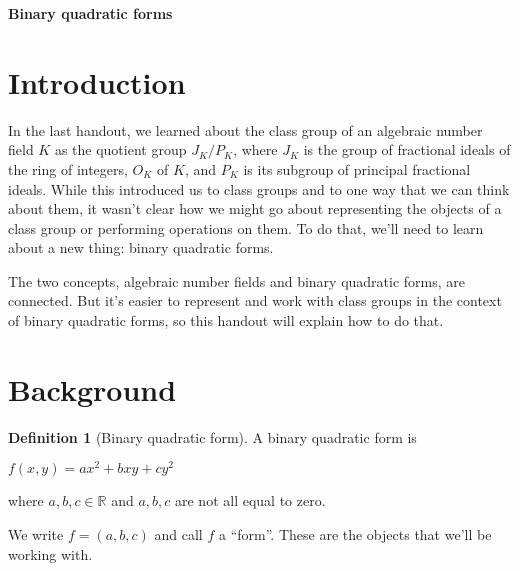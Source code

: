 \documentclass{article}
\theoremstyle{definition}
\newtheorem{definition}{Definition}[section]
\theoremstyle{theorem}
\theoremstyle{example}
\theoremstyle{corollary}
\begin{document}
\begin{center}
\LARGE{\textbf{Binary quadratic forms}}
\end{center}



\bigskip
\bigskip
\bigskip




\bigskip

\section{Introduction}

\bigskip

In the last handout, we learned about the class group of an algebraic number field \(K\) as the quotient group \(J_{K}/P_{K}\), where \(J_{K}\) is the group of fractional ideals of the ring of integers, \(O_{K}\) of \(K\), and \(P_{K}\) is its subgroup of principal fractional ideals. While this introduced us to class groups and to one way that we can think about them, it wasn't clear how we might go about representing the objects of a class group or performing operations on them. To do that, we'll need to learn about a new thing: binary quadratic forms.

\bigskip

The two concepts, algebraic number fields and binary quadratic forms, are connected. But it's easier to represent and work with class groups in the context of binary quadratic forms, so this handout will explain how to do that.

\bigskip

\section{Background}

\bigskip

\theoremstyle{definition}
\begin{definition}[Binary quadratic form]
A binary quadratic form is
\begin{center}
\(f(x, y) = a x^{2} + b x y + c y^{2}\)
\end{center}
where \(a, b, c \in \mathbb{R}\) and \(a, b, c\) are not all equal to zero.
\end{definition}

\bigskip

We write \(f = (a, b, c)\) and call \(f\) a ``form''. These are the objects that we'll be working with.

\bigskip
\end{document}
